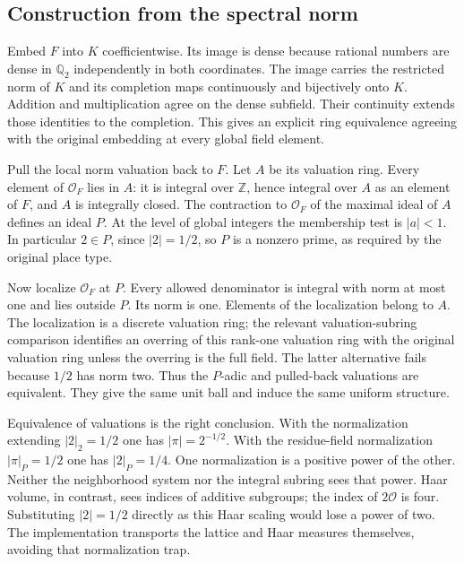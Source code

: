 \documentclass[12pt,letterpaper]{article}
\begin{document}
\subsection{Construction from the spectral norm}
Embed $F$ into $K$ coefficientwise. Its image is dense because rational numbers are dense in $\mathbb Q_2$ independently in both coordinates. The image carries the restricted norm of $K$ and its completion maps continuously and bijectively onto $K$. Addition and multiplication agree on the dense subfield. Their continuity extends those identities to the completion. This gives an explicit ring equivalence agreeing with the original embedding at every global field element.
\par
Pull the local norm valuation back to $F$. Let $A$ be its valuation ring. Every element of $\mathcal O_F$ lies in $A$: it is integral over $\mathbb Z$, hence integral over $A$ as an element of $F$, and $A$ is integrally closed. The contraction to $\mathcal O_F$ of the maximal ideal of $A$ defines an ideal $P$. At the level of global integers the membership test is $|a|<1$. In particular $2\in P$, since $|2|=1/2$, so $P$ is a nonzero prime, as required by the original place type.
\par
Now localize $\mathcal O_F$ at $P$. Every allowed denominator is integral with norm at most one and lies outside $P$. Its norm is one. Elements of the localization belong to $A$. The localization is a discrete valuation ring; the relevant valuation-subring comparison identifies an overring of this rank-one valuation ring with the original valuation ring unless the overring is the full field. The latter alternative fails because $1/2$ has norm two. Thus the $P$-adic and pulled-back valuations are equivalent. They give the same unit ball and induce the same uniform structure.
\par
Equivalence of valuations is the right conclusion. With the normalization extending $|2|_2=1/2$ one has $|\pi|=2^{-1/2}$. With the residue-field normalization $|\pi|_P=1/2$ one has $|2|_P=1/4$. One normalization is a positive power of the other. Neither the neighborhood system nor the integral subring sees that power. Haar volume, in contrast, sees indices of additive subgroups; the index of $2\mathcal O$ is four. Substituting $|2|=1/2$ directly as this Haar scaling would lose a power of two. The implementation transports the lattice and Haar measures themselves, avoiding that normalization trap.
\end{document}
